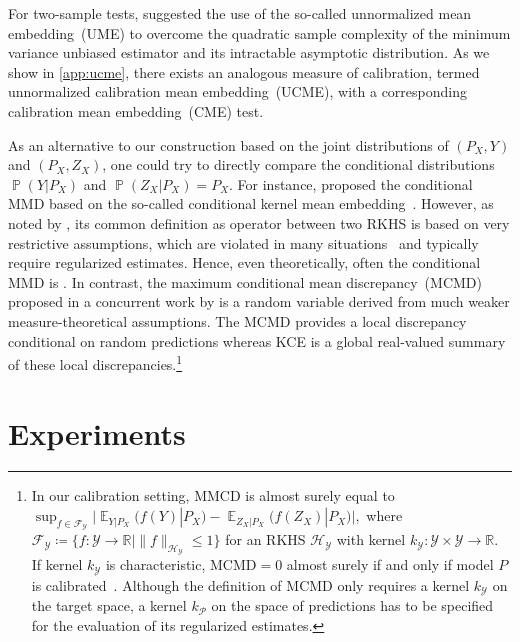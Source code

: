 \documentclass{article}
\DeclareMathOperator{\Prob}{\mathbb{P}}
\DeclareMathOperator{\Exp}{\mathbb{E}}
\begin{document}
For two-sample tests, \citet{Chwialkowski2015} suggested the use
of the so-called unnormalized mean embedding~(UME) to overcome
the quadratic sample complexity of the minimum variance unbiased
estimator and its intractable asymptotic distribution. As we show
in \cref{app:ucme}, there exists an analogous measure of calibration,
termed unnormalized calibration mean embedding~(UCME), with a corresponding
calibration mean embedding~(CME) test.

As an alternative to our construction based on the
joint distributions of $(P_X, Y)$ and $(P_X, Z_X)$, one could try
to directly compare the conditional distributions $\Prob(Y|P_X)$
and $\Prob(Z_X|P_X) = P_X$. For instance, \citet{Ren2016} proposed the
conditional MMD based on the so-called conditional kernel mean
embedding~\citep{Song2009,Song2013}. However, as noted by
\citet{Park2020}, its common definition as operator
between two RKHS is based on very restrictive assumptions, which are violated
in many situations~\citep[see, e.g.,][Footnote~4]{Fukumizu2013}
and typically require regularized estimates. Hence, even theoretically,
often the conditional MMD is
.
In contrast, the maximum conditional mean discrepancy~(MCMD) proposed in a
concurrent work by \citet{Park2020} is a random variable derived from much
weaker measure-theoretical assumptions.
The MCMD provides a local discrepancy conditional on random predictions
whereas KCE is a global real-valued summary of these local
discrepancies.\footnote{In our calibration setting, MMCD is
almost surely equal to
$
    \sup_{f \in \mathcal{F}_\mathcal{Y}}
    \big| \Exp_{Y|P_X}\big(f(Y)|P_X\big) - \Exp_{Z_X|P_X}\big(f(Z_X)|P_X\big) \big|,
$
where $\mathcal{F}_{\mathcal{Y}} \coloneqq \{ f \colon \mathcal{Y} \to \mathbb{R} | \|f\|_{\mathcal{H}_{\mathcal{Y}}} \leq 1 \}$
for an RKHS $\mathcal{H}_{\mathcal{Y}}$ with kernel
$k_{\mathcal{Y}} \colon \mathcal{Y} \times \mathcal{Y} \to \mathbb{R}$.
If kernel $k_{\mathcal{Y}}$ is characteristic, $\mathrm{MCMD} = 0$ almost
surely if and only if model $P$ is calibrated~\citep[Theorem~3.7]{Park2020}. Although the definition of MCMD
only requires
a kernel $k_{\mathcal{Y}}$ on the target space, a kernel $k_{\mathcal{P}}$ on the space of predictions
has to be specified for the evaluation of its regularized estimates.}

\section{Experiments}
\end{document}
